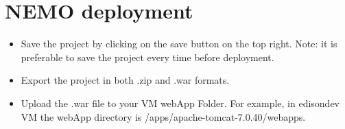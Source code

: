 \section{NEMO deployment}
\begin{itemize}
\item Save the project by clicking on the save button on the top right. Note: it is preferable to save the project every time before deployment. 

\item Export the project in both .zip and .war formats.

\item Upload the .war file to your VM webApp Folder. For example, in edisondev VM the webApp directory is /apps/apache-tomcat-7.0.40/webapps. 
\end{itemize}